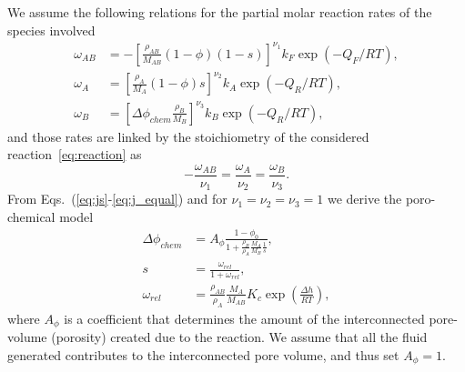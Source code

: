 \documentclass[]{scrreprt}
\begin{document}
We assume the following relations for the partial molar reaction rates of the
species involved
\begin{subequations}
\label{eq:js}
\begin{align}
  \omega_{AB} &= - \left[ \frac{\rho_{AB}}{M_{AB}} (1 - \phi)(1 - s)
  \right]^{\nu_1} k_F \exp(-Q_F/RT), \\
  \omega_A &= \left[ \frac{\rho_{A}}{M_A} (1 - \phi) s \right]^{\nu_2} k_A \exp(-Q_R/RT), \\
  \omega_B &= \left[ \Delta\phi_{chem} \frac{\rho_{B}}{M_B} \right]^{\nu_3} k_B
  \exp(-Q_R/RT),
\end{align}
\end{subequations}
and those rates are linked by the stoichiometry of the considered reaction~\eqref{eq:reaction} as
\begin{equation}
  \label{eq:j_equal}
	-\frac{\omega_{AB}}{\nu_1} = \frac{\omega_A}{\nu_2} = \frac{\omega_B}{\nu_3}.
\end{equation}
From Eqs.~(\ref{eq:js}-\ref{eq:j_equal}) and for $\nu_1=\nu_2=\nu_3=1$ we
derive the poro-chemical model
\begin{subequations}
\label{eq:s_phi_chem}
\begin{align}
  \Delta \phi_{chem} &= A_{\phi} \frac{1-\phi_0}{1 + \frac{\rho_{B}}{\rho_{A}} \frac{M_{A}}{M_{B}} \frac{1}{s}}, \\
  s &= \frac {\omega_{rel}} {1+\omega_{rel}},\\
  \omega_{rel} &= \frac{\rho_{AB}}{\rho_{A}} \frac{M_{A}}{M_{AB}} K_c \exp
  \left( \frac{\Delta h}{RT} \right),
\end{align}
\end{subequations}
where
$A_{\phi}$ is a coefficient that determines the amount of the
interconnected pore-volume (porosity) created due to the reaction. We assume
that all the fluid generated contributes to the interconnected pore volume, and
thus set $A_{\phi} = 1$.
\end{document}
